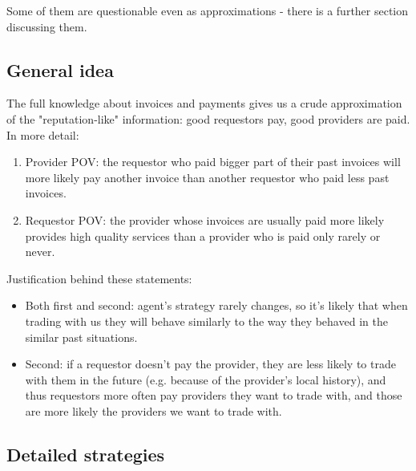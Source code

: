\documentclass{article}
\begin{document}
Some of them are questionable even as approximations - there is a further section discussing them.

\subsection{General idea}

The full knowledge about invoices and payments gives us a crude approximation of the "reputation-like" information: 
good requestors pay, good providers are paid. In more detail:
\begin{enumerate}
    \item Provider POV: the requestor who paid bigger part of their past invoices will more likely pay another invoice than another requestor
        who paid less past invoices.
    \item Requestor POV: the provider whose invoices are usually paid more likely provides high quality services than a provider who is paid
        only rarely or never.
\end{enumerate}

Justification behind these statements:
\begin{itemize}
    \item Both first and second: agent's strategy rarely changes, so it's likely that when trading with us
        they will behave similarly to the way they behaved in the similar past situations.
    \item Second: if a requestor doesn't pay the provider, they are less likely to trade with them in the future (e.g. because of the provider's local history), 
        and thus requestors more often pay providers they want to trade with, and those are more likely the providers we want to trade with.
\end{itemize}

\subsection{Detailed strategies}
\end{document}
